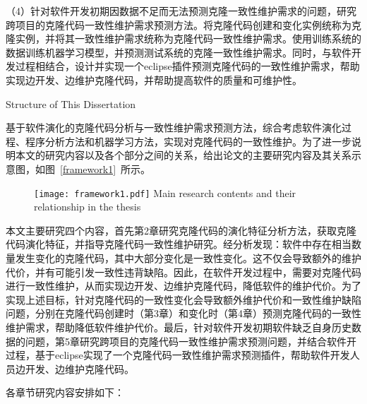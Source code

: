 （4）针对软件开发初期因数据不足而无法预测克隆一致性维护需求的问题，研究跨项目的克隆代码一致性维护需求预测方法。将克隆代码创建和变化实例统称为克隆实例，并将其一致性维护需求统称为克隆代码一致性维护需求。使用训练系统的数据训练机器学习模型，并预测测试系统的克隆一致性维护需求。同时，与软件开发过程相结合，设计并实现一个eclipse插件预测克隆代码的一致性维护需求，帮助实现边开发、边维护克隆代码，并帮助提高软件的质量和可维护性。

{Structure of This Dissertation}

基于软件演化的克隆代码分析与一致性维护需求预测方法，综合考虑软件演化过程、程序分析方法和机器学习方法，实现对克隆代码的一致性维护。为了进一步说明本文的研究内容以及各个部分之间的关系，给出论文的主要研究内容及其关系示意图，如图~\ref{framework1}~所示。

\begin{figure}[htbp]
\centering
\texttt{[image: framework1.pdf]}
{Main research contents and their relationship in the thesis}
\vspace{-1em}
\end{figure}

本文主要研究四个内容，首先第2章研究克隆代码的演化特征分析方法，获取克隆代码演化特征，并指导克隆代码一致性维护研究。经分析发现：软件中存在相当数量发生变化的克隆代码，其中大部分变化是一致性变化。这不仅会导致额外的维护代价，并有可能引发一致性违背缺陷。因此，在软件开发过程中，需要对克隆代码进行一致性维护，从而实现边开发、边维护克隆代码，降低软件的维护代价。为了实现上述目标，针对克隆代码的一致性变化会导致额外维护代价和一致性维护缺陷问题，分别在克隆代码创建时（第3章）和变化时（第4章）预测克隆代码的一致性维护需求，帮助降低软件维护代价。最后，针对软件开发初期软件缺乏自身历史数据的问题，第5章研究跨项目的克隆代码一致性维护需求预测问题，并结合软件开过程，基于eclipse实现了一个克隆代码一致性维护需求预测插件，帮助软件开发人员边开发、边维护克隆代码。




各章节研究内容安排如下：

